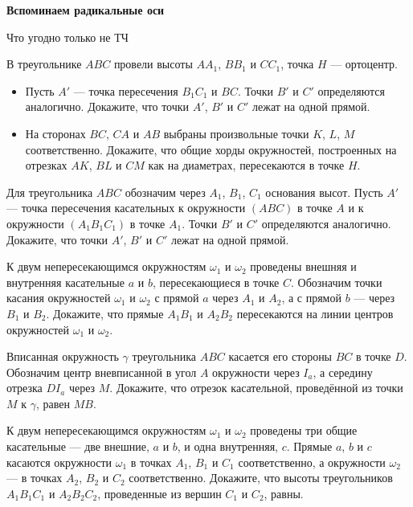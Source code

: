 \centerline{\bf \Huge Вспоминаем радикальные оси}

\begin{flushright}
        \scriptsize{Что угодно только не ТЧ}
\end{flushright}

В треугольнике $ABC$ провели высоты $AA_1$, $BB_1$ и $CC_1$, точка $H$ --- ортоцентр.
\begin{itemize}
    \item[(a)] Пусть $A'$ --- точка пересечения $B_1C_1$ и $BC$. Точки $B'$ и $C'$ определяются аналогично. Докажите, что точки $A'$, $B'$ и $C'$ лежат на одной прямой.
    \item[(b)] На сторонах $BC$, $CA$ и $AB$ выбраны произвольные точки $K$, $L$, $M$ соответственно. Докажите, что общие хорды окружностей, построенных на отрезках $AK$, $BL$ и $CM$ как на диаметрах, пересекаются в точке $H$.
\end{itemize}

Для треугольника $ABC$ обозначим через $A_1$, $B_1$, $C_1$ основания высот. Пусть $A'$ --- точка пересечения касательных к окружности $(ABC)$ в точке $A$ и к окружности $(A_1B_1C_1)$ в точке $A_1$. Точки $B'$ и $C'$ определяются аналогично. Докажите, что точки $A'$, $B'$ и $C'$ лежат на одной прямой.

К двум непересекающимся окружностям $\omega_1$ и $\omega_2$ проведены внешняя и внутренняя касательные $a$ и $b$, пересекающиеся в точке $C$. Обозначим точки касания окружностей $\omega_1$ и $\omega_2$ с прямой $a$ через $A_1$ и $A_2$, а с прямой $b$ --- через $B_1$ и $B_2$. Докажите, что прямые $A_1B_1$ и $A_2B_2$ пересекаются на линии центров окружностей $\omega_1$ и $\omega_2$.

Вписанная окружность $\gamma$ треугольника $ABC$ касается его стороны $BC$ в точке $D$. Обозначим центр вневписанной в угол $A$ окружности через $I_a$, а середину отрезка $DI_a$ через $M$. Докажите, что отрезок касательной, проведённой из точки $M$ к $\gamma$, равен $MB$.

К двум непересекающимся окружностям $\omega_1$ и $\omega_2$ проведены три общие касательные --- две внешние, $a$ и $b$, и одна внутренняя, $c$. Прямые $a$, $b$ и $c$ касаются окружности $\omega_1$ в точках $A_1$, $B_1$ и $C_1$ соответственно, а окружности $\omega_2$ --- в точках $A_2$, $B_2$ и $C_2$ соответственно. Докажите, что высоты треугольников $A_1B_1C_1$ и $A_2B_2C_2$, проведенные из вершин $C_1$ и $C_2$, равны.

